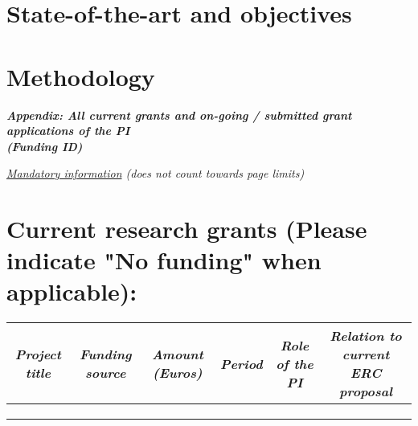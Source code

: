 \documentclass{erc-B2}
\begin{document}
\maketitle
%



\section{State-of-the-art and objectives}
\label{sec:state-of-the-art}


\section{Methodology} 
\label{sec:methodology}


\pagebreak
\bigskip
\large\centering\textbf{\textit{Appendix: All current grants and on-going / submitted grant applications of the PI 
    \\(Funding ID)}}

\large\centering\textit{\underline{Mandatory information} (does not count towards page limits)}

\section*{Current research grants (Please indicate "No funding" when applicable):}
\vspace{-0.4cm}
\begin{table}[h]
  \begin{tabular}{c|c|c|c|c|c}
    \textit{Project title} & \textit{Funding source} & \textit{Amount (Euros)} & \textit{Period} & \textit{Role of the PI} & \textit{Relation to current ERC proposal} \\
    \toprule
    & & & & & \\
    \midrule
    & & & & & \\
    \midrule
    & & & & & \\
    \bottomrule
  \end{tabular}
\end{table}
\end{document}
